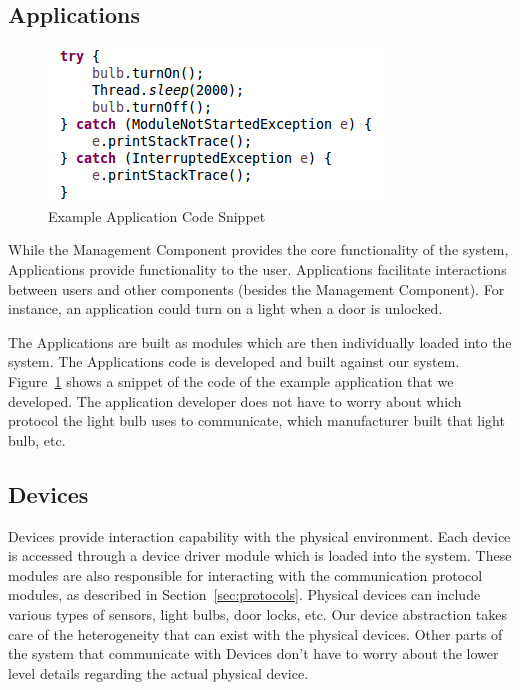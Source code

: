 \subsection{Applications}
\label{sec:apps}
\begin{figure}[tbh]                                                              
    \centering                                                                   
    \includegraphics[width=1.0\columnwidth]{figs/appcode.png}                       
    \caption{Example Application Code Snippet}                                  
    \label{Fig:appcode}                                                             
\end{figure} 
While the Management Component provides the core functionality of the system,
Applications provide functionality to the user. Applications facilitate
interactions between users and other components (besides the Management
Component). For instance, an application could turn on a light when a door is
unlocked.

The Applications are built as modules which are then individually loaded into
the system. The Applications code is developed and built against our system.
Figure~\ref{Fig:appcode} shows a snippet of the code of the example application
that we developed. The application developer does not have to worry about which
protocol the light bulb uses to communicate, which manufacturer built that light
bulb, etc.
\subsection{Devices}
\label{sec:devices}
Devices provide interaction capability with the physical environment. Each
device is accessed through a device driver module which is loaded into the
system. These modules are also responsible for interacting with the
communication protocol modules, as described in Section~\ref{sec:protocols}.
Physical devices can include various types of sensors, light bulbs, door locks,
etc. Our device abstraction takes care of the heterogeneity that can exist with
the physical devices. Other parts of the system that communicate with Devices
don't have to worry about the lower level details regarding the actual physical
device.
